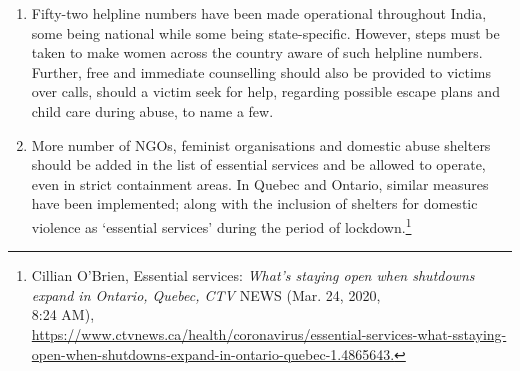 \begin{multicols}{2}
\begin{enumerate}
Several media sources reported that the Police in Gardai, Ireland, have launched
‘Operation Faoiseamh’, so as to contact every domestic abuse victim proactively,
those who had previously contacted the police about any domestic abuse, with an
immediate arrest policy.\footnote{\textit{Operation Faoiseamh}, AN GARDA SIOCHANA (Jun. 09, 2020), \url{https://www.garda.ie/en/about-us/ourdepartments/office-of-corporate-communications/press-releases/2020/june/operation}\%20faoiseamh\%20-
\%20domestic\\\%20abuse\%209th\%20june\%202020\%20.html.} Similar measures have been undertaken by the police in
Odisha and Tamil Nadu. The Canada government is lending cell-phones and free
services to vulnerable people. Civil societies have tied up with Uber to provide free
emergency rides for victims.\footnote{Meg Black, \textit{Uber Offers Free Rides for People Fleeing Domestic Violence During COVID-19 Pandemic},
GLOBAL CITIZEN (Apr. 29, 2020), \url{https://www.globalcitizen.org/en/content/uber-offers-free-ries-for-peoplefleeing-domestic/.}}

In India, government authorities can learn from the same and adopt such innovative
initiatives as well as take the support from the private sector to scale up the initiatives. 

\item Fifty-two helpline numbers have been made operational throughout India, some being
national while some being state-specific. However, steps must be taken to make
women across the country aware of such helpline numbers. Further, free and
immediate counselling should also be provided to victims over calls, should a victim
seek for help, regarding possible escape plans and child care during abuse, to name a
few. 

\item More number of NGOs, feminist organisations and domestic abuse shelters should be
added in the list of essential services and be allowed to operate, even in strict
containment areas. In Quebec and Ontario, similar measures have been implemented;
along with the inclusion of shelters for domestic violence as ‘essential services’
during the period of lockdown.\footnote{Cillian O’Brien, Essential services: \textit{What's staying open when shutdowns expand in Ontario, Quebec, CTV}
NEWS (Mar. 24, 2020,\\ 8:24 AM),\\ \url{https://www.ctvnews.ca/health/coronavirus/essential-services-what-sstaying-open-when-shutdowns-expand-in-ontario-quebec-1.4865643.}}


\end{enumerate}
\end{multicols}
